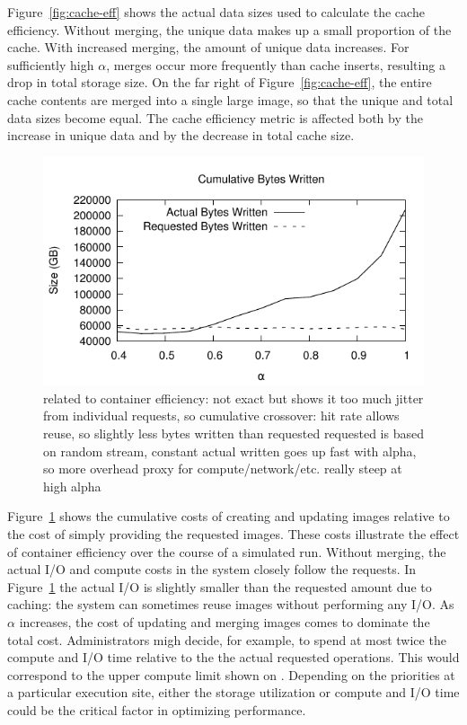 \documentclass[sigconf]{acmart}
\begin{document}
Figure~\ref{fig:cache-eff} shows the actual data sizes used to calculate the cache efficiency.
Without merging, the unique data makes up a small proportion of the cache.
With increased merging, the amount of unique data increases.
For sufficiently high $\alpha$,
merges occur more frequently than cache inserts,
resulting a drop in total storage size.
On the far right of Figure~\ref{fig:cache-eff},
the entire cache contents are merged into a single large image,
so that the unique and total data sizes become equal.
The cache efficiency metric is affected both by the increase in unique data and by the decrease in total cache size.

\begin{figure}
\includegraphics[width=\linewidth]{curated/comparative/container_efficiency.pdf}
\label{fig:container-eff}
related to container efficiency: not exact but shows it
too much jitter from individual requests, so cumulative
crossover: hit rate allows reuse, so slightly less bytes written than requested
requested is based on random stream, constant
actual written goes up fast with alpha, so more overhead
proxy for compute/network/etc.
really steep at high alpha
\fi
\end{figure}

Figure~\ref{fig:container-eff} shows the cumulative costs of creating and updating images relative to the cost of simply providing the requested images.
These costs illustrate the effect of container efficiency over the course of a simulated run.
Without merging, the actual I/O and compute costs in the system closely follow the requests.
In Figure~\ref{fig:container-eff} the actual I/O is slightly smaller than the requested amount due to caching:
the system can sometimes reuse images without performing any I/O.
As $\alpha$ increases, the cost of updating and merging images comes to dominate the total cost.
Administrators migh decide, for example,
to spend at most twice the compute and I/O time relative to the the actual requested operations.
This would correspond to the upper compute limit shown on \label{fig:dist-eff}.
Depending on the priorities at a particular execution site,
either the storage utilization or compute and I/O time could be the critical factor in optimizing performance.
\end{document}
